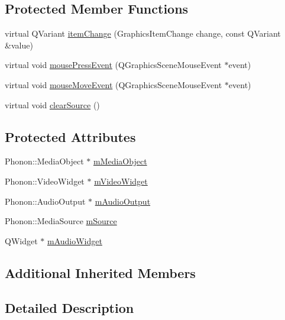 \subsection*{Protected Member Functions}
\begin{DoxyCompactItemize}
\item 
virtual Q\-Variant \hyperlink{class_u_b_graphics_media_item_a4933021f361b9b5b65f57b20adc7a256}{item\-Change} (Graphics\-Item\-Change change, const Q\-Variant \&value)
\item 
virtual void \hyperlink{class_u_b_graphics_media_item_a45ef0fbd6b506782320f17857eca2b0c}{mouse\-Press\-Event} (Q\-Graphics\-Scene\-Mouse\-Event $\ast$event)
\item 
virtual void \hyperlink{class_u_b_graphics_media_item_aaf2f1c0a6715a31b5ea606952914e3d5}{mouse\-Move\-Event} (Q\-Graphics\-Scene\-Mouse\-Event $\ast$event)
\item 
virtual void \hyperlink{class_u_b_graphics_media_item_a98799d58687c67abca77174f4bcc2e52}{clear\-Source} ()
\end{DoxyCompactItemize}
\subsection*{Protected Attributes}
\begin{DoxyCompactItemize}
\item 
Phonon\-::\-Media\-Object $\ast$ \hyperlink{class_u_b_graphics_media_item_a05333e3836a8f9e3dd9658ef5e2009f9}{m\-Media\-Object}
\item 
Phonon\-::\-Video\-Widget $\ast$ \hyperlink{class_u_b_graphics_media_item_aa64eaf00cd632a1d8eca70ccd6a61029}{m\-Video\-Widget}
\item 
Phonon\-::\-Audio\-Output $\ast$ \hyperlink{class_u_b_graphics_media_item_a9b39fa6d96948627ee61a0ba82a4ecdc}{m\-Audio\-Output}
\item 
Phonon\-::\-Media\-Source \hyperlink{class_u_b_graphics_media_item_a949d95040d1999f123f94c06c0e35ffd}{m\-Source}
\item 
Q\-Widget $\ast$ \hyperlink{class_u_b_graphics_media_item_aedab2a57e159cbc15e470614b0ef2f2c}{m\-Audio\-Widget}
\end{DoxyCompactItemize}
\subsection*{Additional Inherited Members}


\subsection{Detailed Description}


